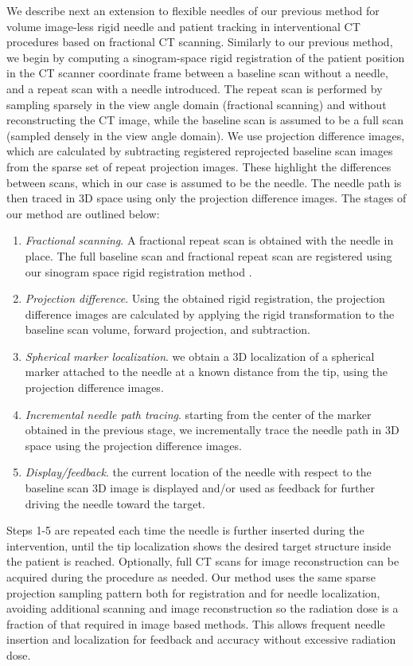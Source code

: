 \documentclass[letterpaper, 11 pt, conference]{ieeeconf}  %
\begin{document}
We describe next an extension to flexible needles of our previous method \cite{medan2017reduced} for volume image-less rigid needle and patient tracking in interventional CT procedures based on fractional CT scanning. Similarly to our previous method, we begin by computing a sinogram-space rigid registration of the patient position in the CT scanner coordinate frame between a baseline scan without a needle, and a repeat scan with a needle introduced. The repeat scan is performed by sampling sparsely in the view angle domain (fractional scanning) and without reconstructing the CT image, while the baseline scan is assumed to be a full scan (sampled densely in the view angle domain). We use projection difference images, which are calculated by subtracting registered reprojected baseline scan images from the sparse set of repeat projection images. These highlight the differences between scans, which in our case is assumed to be the needle. The needle path is then traced in 3D space using only the projection difference images. The stages of our method are outlined below:
\begin{enumerate}
\item \textit{Fractional scanning}. A fractional repeat scan is obtained with the needle in place. The full baseline scan and fractional repeat scan are registered using our sinogram space rigid registration method \cite{medan2017sparse}.
\item \textit{Projection difference}. Using the obtained rigid registration, the projection difference images are calculated by applying the rigid transformation to the baseline scan volume, forward projection, and subtraction.
\item \textit{Spherical marker localization}. we obtain a 3D localization of a spherical marker attached to the needle at a known distance from the tip, using the projection difference images.
\item \textit{Incremental needle path tracing}. starting from the center of the marker obtained in the previous stage, we incrementally trace the needle path in 3D space using the projection difference images.
\item \textit{Display/feedback}. the current location of the needle with respect to the baseline scan 3D image is displayed and/or used as feedback for further driving the needle toward the target.
\end{enumerate}
Steps 1-5 are repeated each time the needle is further inserted during the intervention, until the tip localization shows the desired target structure inside the patient is reached. Optionally, full CT scans for image reconstruction can be acquired during the procedure as needed. Our method uses the same sparse projection sampling pattern both for registration and for needle localization, avoiding additional scanning and image reconstruction so the radiation dose is a fraction of that required in image based methods. This allows frequent needle insertion and localization for feedback and accuracy without excessive radiation dose.
\end{document}
